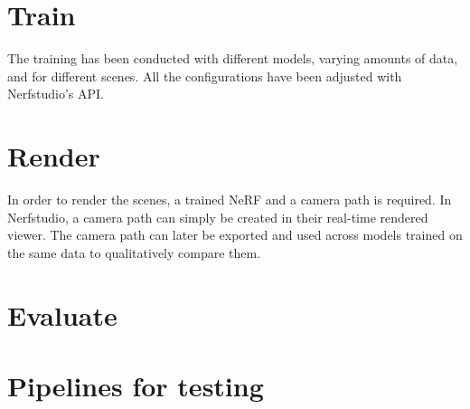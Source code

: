 
\section{Train}
The training has been conducted with different models, varying amounts of data, and for different scenes. All the configurations have been adjusted with Nerfstudio's API.

\section{Render}
In order to render the scenes, a trained NeRF and a camera path is required. In Nerfstudio, a camera path can simply be created in their real-time rendered viewer. The camera path can later be exported and used across models trained on the same data to qualitatively compare them.


\section{Evaluate}


\section{Pipelines for testing}
